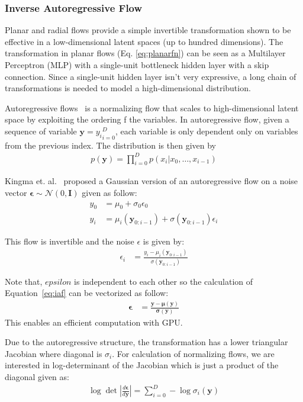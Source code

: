 \documentclass[runningheads]{llncs}
\begin{document}
\subsubsection{Inverse Autoregressive Flow} Planar and radial flows provide a simple invertible transformation shown to be effective in a low-dimensional latent spaces (up to hundred dimensions). The transformation in planar flows (Eq. \ref{eq:planarfn}) can be seen as a Multilayer Perceptron (MLP) with a single-unit bottleneck hidden layer with a skip connection. Since a single-unit hidden layer isn't very expressive, a long chain of transformations is needed to model a high-dimensional distribution. 

Autoregressive flows~\cite{germain2015made} is a normalizing flow that scales to high-dimensional latent space by exploiting the ordering f the variables. In autoregressive flow, given a sequence of variable $\mathbf{y} = {y_i}_{i=0}^D$, each variable is only dependent only on variables from the previous index. The distribution is then given by
\begin{align}
p(\mathbf{y}) = \prod_{i=0}^{D} p(x_i | x_0,\dots,x_{i-1})
\end{align} 	 

Kingma et. al.~\cite{kingma2016improved} proposed a Gaussian version of an autoregressive flow on a noise vector $\mathbf{\epsilon} \sim \mathcal{N}(0,\mathbf{I})$ given as follow:
\begin{align}
y_0 &= \mu_0 + \sigma_0 \epsilon_0\label{eq:iaffn1}\\
y_i &= \mu_i(\mathbf{y}_{0:i-1}) + \sigma(\mathbf{y}_{0:i-1}) \epsilon_i\label{eq:iaffn2}
\end{align} 

This flow is invertible and the noise $\epsilon$ is given by:
\begin{align}
\epsilon_i &= \frac{y_i - \mu_i(\mathbf{y}_{0:i-1})}{\sigma(\mathbf{y}_{0:i-1})}
\label{eq:iaf}
\end{align} 

Note that, $epsilon$ is independent to each other so the calculation of Equation~\ref{eq:iaf} can be vectorized as follow:
\begin{align}
\bm{\epsilon} &= \frac{\mathbf{y} - \bm{\mu}(\mathbf{y})}{\bm{\sigma}(\mathbf{y})}
\end{align} 
This enables an efficient computation with GPU. 

Due to the autoregressive structure, the transformation has a lower triangular Jacobian where diagonal is $\sigma_i$. For calculation of normalizing flows, we are interested in log-determinant of the Jacobian which is just a product of the diagonal given as:
\begin{align}
\log \det \left| \frac{d\bm{\epsilon}}{d\mathbf{y}} \right| = \sum_{i=0}^{D} - \log \sigma_i(\mathbf{y})
\end{align}
\end{document}
